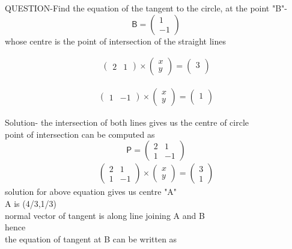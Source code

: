 \documentclass{beamer}
\begin{document}
QUESTION-Find the equation of the tangent to the circle,
at the point "B"-
$$
\mathsf{B} =
\begin{pmatrix}
1\\
-1
\end{pmatrix}
$$
whose centre is the point of intersection of the
straight lines


\begin{align}
\begin{pmatrix}
    2 & 1 
\end{pmatrix}
\times
\begin{pmatrix}
    x \\
    y
\end{pmatrix}
=
\begin{pmatrix}
    3  \\
\end{pmatrix}
\end{align}


\begin{align}
\begin{pmatrix}
    1 & -1 
\end{pmatrix}
\times
\begin{pmatrix}
    x \\
    y
\end{pmatrix}
=
\begin{pmatrix}
    1  \\
\end{pmatrix}
\end{align}

Solution-
the intersection of both lines gives us the centre of circle\\
point of intersection can be computed as 
\begin{equation}
\mathsf{P} =
\begin{pmatrix}
2 & 1 \\
1 & -1 
\end{pmatrix}
\end{equation}
\begin{align}
\begin{pmatrix}
    2 & 1 \\
    1 & -1
\end{pmatrix}
\times
\begin{pmatrix}
    x \\
    y
\end{pmatrix}
=
\begin{pmatrix}
    3  \\
    1
\end{pmatrix}
\end{align}
solution for above equation gives us centre "A"\\
A is (4/3,1/3)\\
normal vector of tangent is along line joining A and B\\
hence\\
the equation of tangent at B can be written as
\end{document}
